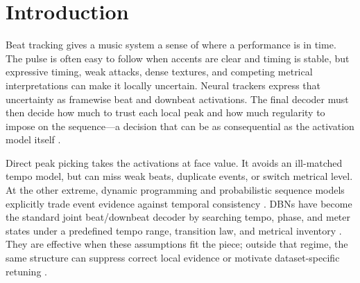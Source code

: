 \documentclass{article}
\begin{document}

\section{Introduction}
\label{sec:intro}
Beat tracking gives a music system a sense of where a performance is in time.
The pulse is often easy to follow when accents are clear and timing is stable,
but expressive timing, weak attacks, dense textures, and competing metrical
interpretations can make it locally uncertain. Neural trackers express that
uncertainty as framewise beat and downbeat activations. The final decoder must
then decide how much to trust each local peak and how much regularity to impose
on the sequence---a decision that can be as consequential as the activation
model itself \cite{chiu2023localperiodicity,foscarin2024beat}.

Direct peak picking takes the activations at face value. It avoids an
ill-matched tempo model, but can miss weak beats, duplicate events, or switch
metrical level. At the other extreme, dynamic programming and probabilistic
sequence models explicitly trade event evidence against temporal consistency
\cite{ellis2007beattracking,korzeniowski2014crf,fillon2015crf}. DBNs have become
the standard joint beat/downbeat decoder by searching tempo, phase, and meter
states under a predefined tempo range, transition law, and metrical inventory
\cite{krebs2015dbn,bock2016joint}. They are effective when these assumptions fit
the piece; outside that regime, the same structure can suppress correct local
evidence or motivate dataset-specific retuning
\cite{foscarin2024beat,ahn2026smcblindspot}.
\end{document}
